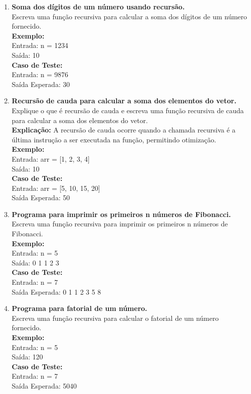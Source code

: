\documentclass[12pt]{article}
\begin{document}
\begin{enumerate}
    \item \textbf{Soma dos dígitos de um número usando recursão.} \\
    Escreva uma função recursiva para calcular a soma dos dígitos de um número fornecido. \\
    \textbf{Exemplo:} \\
    Entrada: n = 1234 \\
    Saída: 10 \\
    \textbf{Caso de Teste:} \\
    Entrada: n = 9876 \\
    Saída Esperada: 30
    
    \item \textbf{Recursão de cauda para calcular a soma dos elementos do vetor.} \\
    Explique o que é recursão de cauda e escreva uma função recursiva de cauda para calcular a soma dos elementos do vetor. \\
    \textbf{Explicação:} A recursão de cauda ocorre quando a chamada recursiva é a última instrução a ser executada na função, permitindo otimização. \\
    \textbf{Exemplo:} \\
    Entrada: arr = [1, 2, 3, 4] \\
    Saída: 10 \\
    \textbf{Caso de Teste:} \\
    Entrada: arr = [5, 10, 15, 20] \\
    Saída Esperada: 50
    
    \item \textbf{Programa para imprimir os primeiros n números de Fibonacci.} \\
    Escreva uma função recursiva para imprimir os primeiros n números de Fibonacci. \\
    \textbf{Exemplo:} \\
    Entrada: n = 5 \\
    Saída: 0 1 1 2 3 \\
    \textbf{Caso de Teste:} \\
    Entrada: n = 7 \\
    Saída Esperada: 0 1 1 2 3 5 8
    
    \item \textbf{Programa para fatorial de um número.} \\
    Escreva uma função recursiva para calcular o fatorial de um número fornecido. \\
    \textbf{Exemplo:} \\
    Entrada: n = 5 \\
    Saída: 120 \\
    \textbf{Caso de Teste:} \\
    Entrada: n = 7 \\
    Saída Esperada: 5040
    

\end{enumerate}
\end{document}
